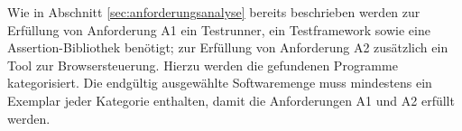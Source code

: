 Wie in Abschnitt \ref{sec:anforderungsanalyse} bereits beschrieben werden zur Erfüllung von Anforderung A1 ein Testrunner, ein Testframework sowie eine Assertion-Bibliothek benötigt; zur Erfüllung von Anforderung A2 zusätzlich ein Tool zur Browsersteuerung. Hierzu werden die gefundenen Programme kategorisiert. Die endgültig ausgewählte Softwaremenge muss mindestens ein Exemplar jeder Kategorie enthalten, damit die Anforderungen A1 und A2 erfüllt werden.

